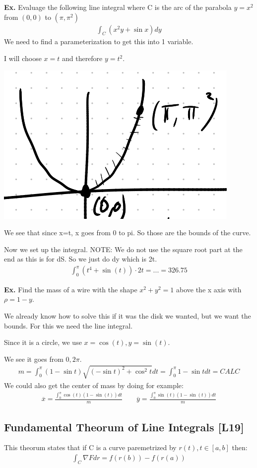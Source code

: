 \documentclass[12pt,letterpaper]{article} \usepackage{amsmath} \usepackage{graphicx} \usepackage[margin=1in]{geometry} \usepackage{longtable}  \usepackage{amssymb}
\begin{document}
	\begin{mdframed}[]
	\textbf{Ex. } Evaluage the following line integral where C is the arc of the parabola $y=x^2$ from $(0,0)$ to $(\pi,\pi^2)$
	\begin{align*}
		\int_C (x^2y+\sin x)dy
	\end{align*}
	We need to find a parameterization to get this into 1 variable. 
	
	I will choose $x=t$ and therefore $y=t^2$.
	\begin{center}
		\includegraphics[width=0.2\linewidth]{ex3}
	\end{center}
	We see that since x=t, x goes from 0 to pi. So those are the bounds of the curve. 
	
	Now we set up the integral. NOTE: We do not use the square root part at the end as this is for dS. So we just do dy which is 2t.
	\begin{align*}
		\int_0^\pi (t^4+\sin(t) )\cdot 2t= ... = 326.75
	\end{align*}
	
	\end{mdframed}
	
	\begin{mdframed}[]
	\textbf{Ex. } Find the mass of a wire with the shape $x^2+y^2=1$ above the x axis with $\rho = 1-y$.
	
	We already know how to solve this if it was the disk we wanted, but we want the bounds. For this we need the line integral.
	
	Since it is a circle, we use $x=\cos(t), y=\sin(t)$. 
	
	We see it goes from $0, 2\pi$. 
	\begin{align*}
		m = \int^\pi_0 (1-\sin t) \sqrt{(-\sin t)^2 + \cos^2 t} dt = \int _0^\pi 1-\sin t dt = CALC
	\end{align*}
	We could also get the center of mass by doing for example:
	\begin{align*}
		\overline{x} = \frac{\int^\pi_0 \cos(t) (1-\sin(t)) dt}{m} \qquad \overline{y} = \frac{\int^\pi_0 \sin(t) (1-\sin(t)) dt}{m}
	\end{align*}
	\end{mdframed}
	
	\subsection{Fundamental Theorum of Line Integrals [L19]}
	This theorum states that if C is a curve paremetrized by $r(t), t\in[a,b]$ then: 
	\begin{align*}
		\int_C \nabla F dr = f(r(b))-f(r(a))
	\end{align*}
\end{document}
